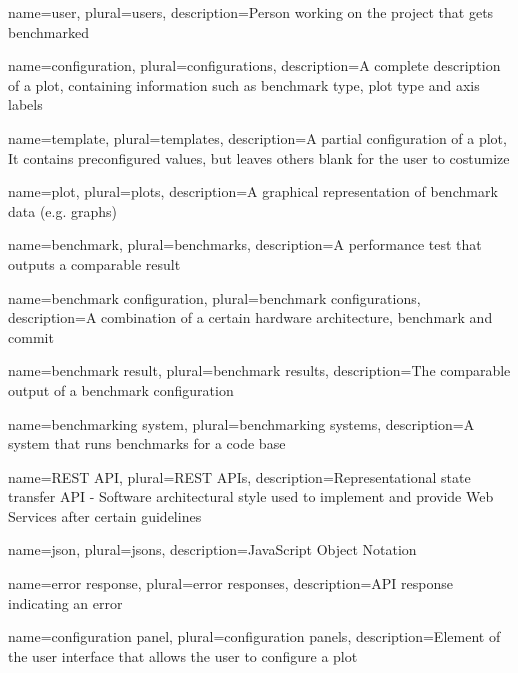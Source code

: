 \makenoidxglossaries

{
	name=user,
	plural=users,
	description={Person working on the project that gets benchmarked}
}

{
	name=configuration,
	plural=configurations,
	description={A complete description of a \gls{plot}, containing information such as benchmark type, plot type and axis labels}
}

{
	name=template,
	plural=templates,
	description={A partial configuration of a \gls{plot}, It contains preconfigured values, but leaves others blank for the user to costumize}
}

{
	name=plot,
	plural=plots,
	description={A graphical representation of benchmark data (e.g. graphs)}
}

{
	name=benchmark,
	plural=benchmarks,
	description={A performance test that outputs a comparable result}
}

{
	name=benchmark configuration,
	plural=benchmark configurations,
	description={A combination of a certain hardware architecture, \gls{benchmark} and commit}
}

{
	name=benchmark result,
	plural=benchmark results,
	description={The comparable output of a \gls{benchmark configuration}}
}

{
	name=benchmarking system,
	plural=benchmarking systems,
	description={A system that runs benchmarks for a code base}
}

{
	name=REST API,
	plural=REST APIs,
	description={Representational state transfer API - Software architectural style used to implement and provide Web Services after certain guidelines}
}


{
    name=json,
    plural=jsons,
    description={JavaScript Object Notation}
}

{
    name=error response,
    plural=error responses,
    description={API response indicating an error}
}

{
    name=configuration panel,
    plural=configuration panels,
    description={Element of the user interface that allows the user to configure a plot}
}
